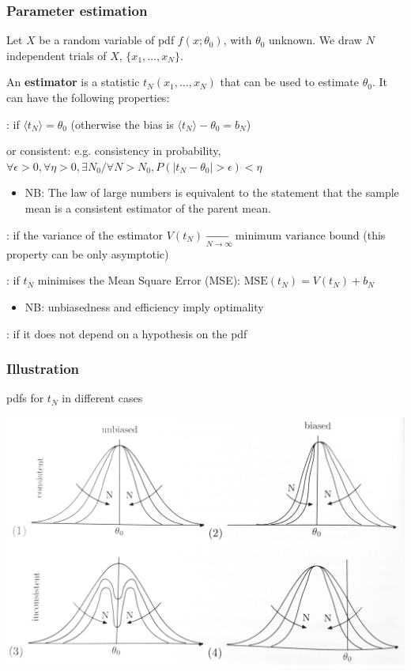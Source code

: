 \documentclass[9pt]{beamer}
\newif\ifmynote
\newcommand\mynote[1]{%
\ifmynote \textbf{#1} \else \fi
}
\begin{document}
\begin{frame}
 \frametitle{Parameter estimation}
 
 Let $X$ be a random variable of pdf $f(x;\theta_0)$, with $\theta_0$ unknown. We draw $N$ independent trials of $X$, $\{x_1,\dots,x_N\}$.
 
 
 An \textbf{estimator} is a statistic $t_N(x_1,\dots,x_N)$ that can be used to estimate $\theta_0$. It can have the following properties:
 
 \mynote{Écrire au tableau le nom des différentes prioriétés, les afficher 1 par 1 au tableau}
 
 \begin{description}
  \item<2->[unbiased]: if $\langle t_N \rangle = \theta_0$ (otherwise the bias is $\langle t_N \rangle - \theta_0 = b_N$)
  \item<3->[convergent] or consistent: e.g. consistency in probability, $\forall \epsilon>0, \forall \eta>0, \exists N_0 / \forall N>N_0, P(|t_N - \theta_0|>\epsilon)<\eta$
  \begin{itemize}
   \item NB: The law of large numbers is equivalent to the statement that the sample mean is a consistent estimator of the parent mean.
  \end{itemize}
  \item<4->[efficient]: if the variance of the estimator $V(t_N) \xrightarrow[N\to\infty]{} \text{minimum variance bound}$ (this property can be only asymptotic)
  \item<5->[optimal]: if $t_N$ minimises the Mean Square Error (MSE): $\text{MSE}(t_N) = V(t_N) + b_N$
  \begin{itemize}
   \item NB: unbiasedness and efficiency imply optimality
  \end{itemize}
  \item<6>[robust]: if it does not depend on a hypothesis on the pdf
 \end{description}

\end{frame}

\begin{frame}
 \frametitle{Illustration}
 
 pdfs for $t_N$ in different cases
 
 \includegraphics[width=\textwidth]{estimators.jpg}
\end{frame}
\end{document}
